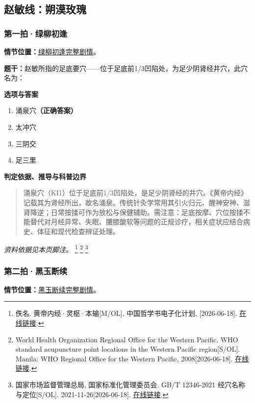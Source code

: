 
\subsection{赵敏线：朔漠玫瑰}

\subsubsection{第一拍·绿柳初逢}\label{question:zhaomin:1}
\textbf{情节位置：}\hyperref[plot:zhaomin:1]{绿柳初逢完整剧情}。

\textbf{题干：}赵敏所指的足底要穴——位于足底前1/3凹陷处，为足少阴肾经井穴，此穴名为：

\textbf{选项与答案}
\begin{enumerate}[label=\Alph*.,leftmargin=*]
  \item 涌泉穴\textbf{（正确答案）}
  \item 太冲穴
  \item 三阴交
  \item 足三里
\end{enumerate}
\textbf{判定依据、推导与科普边界}
\begin{quote}涌泉穴（KI1）位于足底前1/3凹陷处，是足少阴肾经的井穴。《黄帝内经》记载其为肾经所出，故名涌泉。传统针灸学常用其引火归元、醒神安神、滋肾降逆；日常按揉可作为放松与保健辅助。需注意：足底按摩、穴位按揉不能替代对月经异常、失眠、腰膝酸软等问题的正规诊疗，相关症状应结合病史、体征和现代检查辨证处理。\end{quote}
\noindent\textit{资料依据见本页脚注。}
\footnote{佚名. 黄帝内经·灵枢·本输[M/OL]. 中国哲学书电子化计划, [2026-06-18]. \href{https://ctext.org/huangdi-neijing/ben-shu/zhs}{在线链接}.}
\footnote{World Health Organization Regional Office for the Western Pacific. WHO standard acupuncture point locations in the Western Pacific region[S/OL]. Manila: WHO Regional Office for the Western Pacific, 2008[2026-06-18]. \href{https://iris.who.int/items/f188654a-d8a7-4519-9979-8e2de713c060}{在线链接}.}
\footnote{国家市场监督管理总局, 国家标准化管理委员会. GB/T 12346-2021 经穴名称与定位[S/OL]. 2021-11-26[2026-06-18]. \href{https://openstd.samr.gov.cn/bzgk/std/newGbInfo?hcno=397548AE7248D3D87DD15E0AB8107185}{在线链接}.}

\subsubsection{第二拍·黑玉断续}\label{question:zhaomin:2}
\textbf{情节位置：}\hyperref[plot:zhaomin:2]{黑玉断续完整剧情}。

